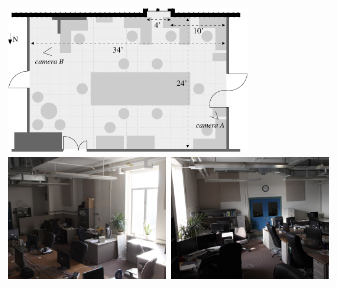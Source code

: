 \begin{figure}[t]
\centering
\includegraphics[width=2.5in]{../gi2012_userstudy/images/lab.pdf} \vspace{0.1in}
\\
\includegraphics[width=1.65in]{../gi2012_userstudy/images/photos/camera_angle_2_lights_off.jpg}
\includegraphics[width=1.65in]{../gi2012_userstudy/images/photos/camera_angle_3_lights_off.jpg}\vspace{-0.19in}\\
\begin{minipage}{1.65in}~{\color{white}{\em camera A}}\end{minipage}
\begin{minipage}{1.65in}~{\color{white}{\em camera B}}\end{minipage}\vspace{0.0in}\\

\end{figure}
